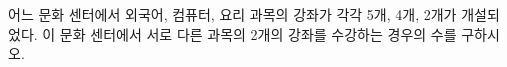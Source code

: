 어느 문화 센터에서 외국어, 컴퓨터, 요리 과목의 강좌가 각각 5개, 4개, 2개가 개설되었다. 이 문화 센터에서 서로 다른 과목의 2개의 강좌를 수강하는 경우의 수를 구하시오. 
